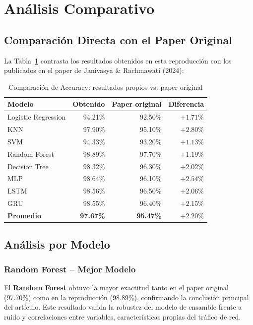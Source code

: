 \documentclass[12pt,a4paper]{article}
\begin{document}
\section{Análisis Comparativo}
\label{sec:analisis}

\subsection{Comparación Directa con el Paper Original}

La Tabla~\ref{tab:comparacion} contrasta los resultados obtenidos en esta reproducción
con los publicados en el paper de Janivasya \& Rachmawati (2024):

\begin{table}[H]
\centering
\caption{Comparación de Accuracy: resultados propios vs. paper original}
\label{tab:comparacion}
\begin{tabular}{lrrr}
\toprule
\textbf{Modelo} & \textbf{Obtenido} & \textbf{Paper original} & \textbf{Diferencia} \\
\midrule
Logistic Regression & 94.21\% & 92.50\% & $+1.71\%$ \\
KNN                 & 97.90\% & 95.10\% & $+2.80\%$ \\
SVM                 & 94.33\% & 93.20\% & $+1.13\%$ \\
\rowcolor{green!10}
Random Forest       & 98.89\% & 97.70\% & $+1.19\%$ \\
Decision Tree       & 98.32\% & 96.30\% & $+2.02\%$ \\
MLP                 & 98.64\% & 96.10\% & $+2.54\%$ \\
LSTM                & 98.56\% & 96.50\% & $+2.06\%$ \\
GRU                 & 98.55\% & 96.40\% & $+2.15\%$ \\
\midrule
\textbf{Promedio}   & \textbf{97.67\%} & \textbf{95.47\%} & $+2.20\%$ \\
\bottomrule
\end{tabular}
\end{table}

\subsection{Análisis por Modelo}

\subsubsection{Random Forest -- Mejor Modelo}
El \textbf{Random Forest} obtuvo la mayor exactitud tanto en el paper original (97.70\%)
como en la reproducción (98.89\%), confirmando la conclusión principal del artículo.
Este resultado valida la robustez del modelo de ensamble frente a ruido y correlaciones
entre variables, características propias del tráfico de red.
\end{document}
